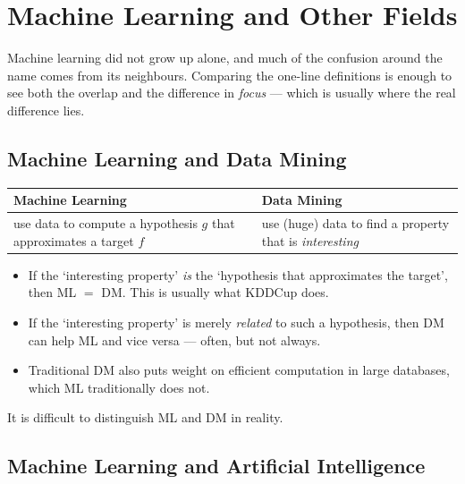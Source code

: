 \section{Machine Learning and Other Fields}\label{sec:other-fields}


Machine learning did not grow up alone, and much of the confusion around the
name comes from its neighbours. Comparing the one-line definitions is enough to
see both the overlap and the difference in \emph{focus} --- which is usually
where the real difference lies.

\subsection{Machine Learning and Data Mining}

\begin{center}
    \begin{tabular}{@{}p{}p{}@{}}
        \toprule
        \textbf{Machine Learning} & \textbf{Data Mining}\\
        \midrule
        use data to compute a hypothesis \(g\) that approximates a target \(f\)
        & use (huge) data to find a property that is \emph{interesting}\\
        \bottomrule
    \end{tabular}
\end{center}

\begin{itemize}
    \item If the `interesting property' \emph{is} the `hypothesis that
        approximates the target', then ML \(=\) DM. This is usually what KDDCup
        does.
    \item If the `interesting property' is merely \emph{related} to such a
        hypothesis, then DM can help ML and vice versa --- often, but not
        always.
    \item Traditional DM also puts weight on efficient computation in large
        databases, which ML traditionally does not.
\end{itemize}

\begin{moral}
    It is difficult to distinguish ML and DM in reality.
\end{moral}

\subsection{Machine Learning and Artificial Intelligence}

